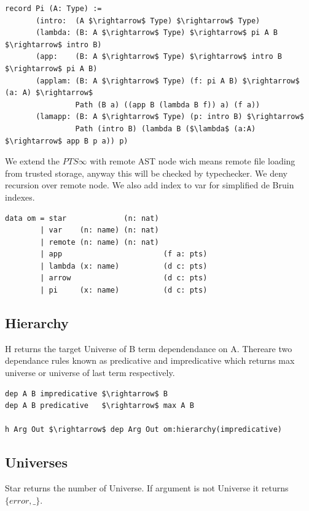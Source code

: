 \documentclass[11pt,oneside]{article}
\begin{document}
\begin{lstlisting}[mathescape=true]
record Pi (A: Type) :=
       (intro:  (A $\rightarrow$ Type) $\rightarrow$ Type)
       (lambda: (B: A $\rightarrow$ Type) $\rightarrow$ pi A B $\rightarrow$ intro B)
       (app:    (B: A $\rightarrow$ Type) $\rightarrow$ intro B $\rightarrow$ pi A B)
       (applam: (B: A $\rightarrow$ Type) (f: pi A B) $\rightarrow$ (a: A) $\rightarrow$
                Path (B a) ((app B (lambda B f)) a) (f a))
       (lamapp: (B: A $\rightarrow$ Type) (p: intro B) $\rightarrow$
                Path (intro B) (lambda B ($\lambda$ (a:A) $\rightarrow$ app B p a)) p)

\end{lstlisting}

We extend the $PTS\infty$ with remote AST node wich means remote file loading
from trusted storage, anyway this will be checked by typechecker. We deny recursion
over remote node. We also add index to var for simplified de Bruin indexes.

\begin{lstlisting}[mathescape=true]
data om = star             (n: nat)
        | var    (n: name) (n: nat)
        | remote (n: name) (n: nat)
        | app                       (f a: pts)
        | lambda (x: name)          (d c: pts)
        | arrow                     (d c: pts)
        | pi     (x: name)          (d c: pts)
\end{lstlisting}

\newpage
\subsection{Hierarchy}
H returns the target Universe of B term dependendance on A. Thereare two dependance rules known
as predicative and impredicative which returns max universe or universe of last term respectively.

\begin{lstlisting}[mathescape=true]
dep A B impredicative $\rightarrow$ B
dep A B predicative   $\rightarrow$ max A B

h Arg Out $\rightarrow$ dep Arg Out om:hierarchy(impredicative)
\end{lstlisting}

\subsection{Universes}
Star returns the number of Universe. If argument is not Universe it returns $\{error,\_\}$.
\end{document}
